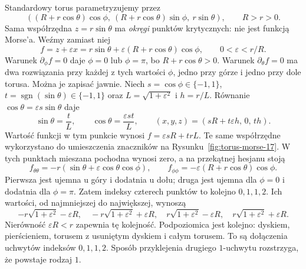 \begin{przyklad}
\label{prz:morse-torus-17}
Standardowy torus parametryzujemy przez
\[
 ((R+r\cos\theta)\cos\phi,\
  (R+r\cos\theta)\sin\phi,\
  r\sin\theta),\qquad R>r>0.
\]
Sama współrzędna $z=r\sin\theta$
ma \emph{okręgi} punktów krytycznych:
nie jest funkcją Morse'a.
Weźmy zamiast niej
\[
 f=z+\varepsilon x
 =r\sin\theta+
    \varepsilon(R+r\cos\theta)\cos\phi,
 \qquad 0<\varepsilon<r/R.
\]
Warunek $\partial_\phi f=0$ daje
$\phi=0$ lub $\phi=\pi$, bo
$R+r\cos\theta>0$.
Warunek $\partial_\theta f=0$ ma
dwa rozwiązania przy każdej z tych
wartości $\phi$, jedno przy górze
i jedno przy dole torusa.
Można je zapisać jawnie. Niech $s=\cos\phi\in\{-1,1\}$,
$t=\operatorname{sgn}(\sin\theta)\in\{-1,1\}$ oraz
$L=\sqrt{1+\varepsilon^2}$ i $h=r/L$.
Równanie $\cos\theta=\varepsilon s\sin\theta$ daje
\[
 \sin\theta=\frac{t}{L},\qquad
 \cos\theta=\frac{\varepsilon st}{L},\qquad
 (x,y,z)=(sR+t\varepsilon h,\,0,\,th).
\]
Wartość funkcji w tym punkcie wynosi
$f=\varepsilon sR+trL$. Te same współrzędne wykorzystano
do umieszczenia znaczników na Rysunku~\ref{fig:torus-morse-17}.
W tych punktach mieszana pochodna
wynosi zero, a na przekątnej hesjanu
stoją
\[
 f_{\theta\theta}
  =-r(\sin\theta+
       \varepsilon\cos\theta\cos\phi),
 \qquad
 f_{\phi\phi}
  =-\varepsilon(R+r\cos\theta)\cos\phi.
\]
Pierwsza jest ujemna u góry
i dodatnia u dołu; druga jest
ujemna dla $\phi=0$
i dodatnia dla $\phi=\pi$.
Zatem indeksy czterech punktów
to kolejno $0,1,1,2$.
Ich wartości, od najmniejszej
do największej, wynoszą
\[
 -r\sqrt{1+\varepsilon^2}-\varepsilon R,\quad
 -r\sqrt{1+\varepsilon^2}+\varepsilon R,\quad
 r\sqrt{1+\varepsilon^2}-\varepsilon R,\quad
 r\sqrt{1+\varepsilon^2}+\varepsilon R.
\]
Nierówność $\varepsilon R<r$
zapewnia tę kolejność.
Podpoziomica jest kolejno:
dyskiem, pierścieniem,
torusem z usuniętym dyskiem
i całym torusem. To są
dołączenia uchwytów indeksów
$0,1,1,2$. Sposób przyklejenia
drugiego $1$-uchwytu rozstrzyga,
że powstaje rodzaj $1$.
\end{przyklad}

